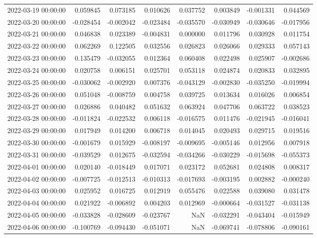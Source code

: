 \begin{tabular}{lrrrrrrr}
2022-03-19 00:00:00 & 0.059845 & 0.073185 & 0.010626 & 0.037752 & 0.003849 & -0.001331 & 0.044569 \\
2022-03-20 00:00:00 & -0.028454 & -0.002042 & -0.023484 & -0.035570 & -0.030949 & -0.030646 & -0.017956 \\
2022-03-21 00:00:00 & 0.046838 & 0.023389 & -0.004831 & 0.000000 & 0.011796 & 0.030928 & 0.011754 \\
2022-03-22 00:00:00 & 0.062269 & 0.122505 & 0.032556 & 0.026823 & 0.026066 & 0.029333 & 0.057143 \\
2022-03-23 00:00:00 & 0.135479 & -0.032055 & 0.012364 & 0.060408 & 0.022498 & 0.025907 & -0.002686 \\
2022-03-24 00:00:00 & 0.020758 & 0.006151 & 0.025701 & 0.053118 & 0.024874 & 0.020833 & 0.032895 \\
2022-03-25 00:00:00 & -0.030062 & -0.002920 & 0.007376 & -0.043129 & -0.002830 & -0.035250 & -0.019994 \\
2022-03-26 00:00:00 & 0.051048 & -0.008759 & 0.004758 & 0.039725 & 0.013634 & 0.016026 & 0.006854 \\
2022-03-27 00:00:00 & 0.026886 & 0.040482 & 0.051632 & 0.063924 & 0.047706 & 0.063722 & 0.038523 \\
2022-03-28 00:00:00 & -0.011824 & -0.022532 & 0.006118 & -0.016575 & 0.011476 & -0.021945 & -0.016041 \\
2022-03-29 00:00:00 & 0.017949 & 0.014200 & 0.006718 & 0.014045 & 0.020493 & 0.029715 & 0.019516 \\
2022-03-30 00:00:00 & -0.001679 & 0.015929 & -0.008197 & -0.009695 & -0.005146 & 0.012956 & 0.007918 \\
2022-03-31 00:00:00 & -0.039529 & 0.012675 & -0.032594 & -0.034266 & -0.030229 & -0.015698 & -0.055373 \\
2022-04-01 00:00:00 & 0.020140 & -0.018449 & 0.017071 & 0.023172 & 0.052681 & 0.024808 & 0.008317 \\
2022-04-02 00:00:00 & -0.007725 & -0.012513 & -0.010313 & -0.017693 & -0.003195 & 0.002882 & -0.000240 \\
2022-04-03 00:00:00 & 0.025952 & 0.016725 & 0.012919 & 0.055476 & 0.022588 & 0.039080 & 0.031478 \\
2022-04-04 00:00:00 & 0.021922 & -0.006892 & 0.004203 & 0.012969 & -0.000664 & -0.031527 & -0.031138 \\
2022-04-05 00:00:00 & -0.033828 & -0.028609 & -0.023767 & NaN & -0.032291 & -0.043404 & -0.015949 \\
2022-04-06 00:00:00 & -0.100769 & -0.094430 & -0.051071 & NaN & -0.069741 & -0.078806 & -0.090161 \\

\end{tabular}
